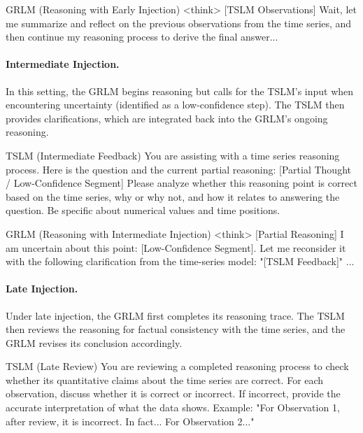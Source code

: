 \documentclass[twoside]{article}
\begin{document}
\begin{promptbox}{GRLM (Reasoning with Early Injection)}
<think> [TSLM Observations]  
Wait, let me summarize and reflect on the previous observations from the time series,  
and then continue my reasoning process to derive the final answer...
\end{promptbox}

\paragraph{Intermediate Injection.}
In this setting, the GRLM begins reasoning but calls for the TSLM’s input when encountering uncertainty (identified as a low-confidence step). The TSLM then provides clarifications, which are integrated back into the GRLM’s ongoing reasoning.

\begin{promptbox}{TSLM (Intermediate Feedback)}
You are assisting with a time series reasoning process.  
Here is the question and the current partial reasoning:  
[Partial Thought / Low-Confidence Segment]  
Please analyze whether this reasoning point is correct based on the time series, why or why not,  
and how it relates to answering the question. Be specific about numerical values and time positions.  
\end{promptbox}

\begin{promptbox}{GRLM (Reasoning with Intermediate Injection)}
<think>  
[Partial Reasoning]  
I am uncertain about this point: [Low-Confidence Segment].  
Let me reconsider it with the following clarification from the time-series model:  
"[TSLM Feedback]" ...
\end{promptbox}

\paragraph{Late Injection.}
Under late injection, the GRLM first completes its reasoning trace.  
The TSLM then reviews the reasoning for factual consistency with the time series, and the GRLM revises its conclusion accordingly.

\begin{promptbox}{TSLM (Late Review)}
You are reviewing a completed reasoning process to check whether its quantitative claims about the time series are correct.  
For each observation, discuss whether it is correct or incorrect.  
If incorrect, provide the accurate interpretation of what the data shows.  
Example:  
"For Observation 1, after review, it is incorrect. In fact... For Observation 2..."  
\end{promptbox}
\end{document}

